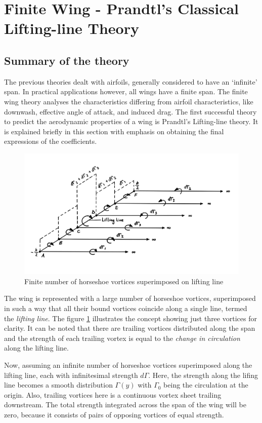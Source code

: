 \documentclass[letterpaper,12pt]{article}
\begin{document}
\section{Finite Wing - Prandtl's Classical Lifting-line Theory}
\subsection{Summary of the theory \cite{anderson}}
The previous theories dealt with airfoils, generally considered to have an `infinite' span. In practical applications however, all wings have a finite span. The finite wing theory analyses the characteristics differing from airfoil characteristics, like downwash, effective angle of attack, and induced drag.
The first successful theory to predict the aerodynamic properties of a wing is Prandtl's Lifting-line theory. It is explained briefly in this section with emphasis on obtaining the final expressions of the coefficients.

\begin{figure}[h]
\includegraphics[scale=0.4]{3.1_finite_vortices}
\centering
\caption{Finite number of horseshoe vortices superimposed on lifting line}
\label{3.1}
\end{figure}

The wing is represented with a large number of horseshoe vortices, superimposed in such a way that all their bound vortices coincide along a single line, termed the \textit{lifting line}. The figure \ref{3.1} illustrates the concept showing just three vortices for clarity. It can be noted that there are trailing vortices distributed along the span and the strength of each trailing vortex is equal to the \textit{change in circulation} along the lifting line.

Now, assuming an infinite number of horseshoe vortices superimposed along the lifting line, each with infinitesimal strength $d\Gamma$. Here, the strength along the lifing line becomes a smooth distribution $\Gamma(y)$ with $\Gamma_0$ being the circulation at the origin. Also, trailing vortices here is a continuous vortex sheet trailing downstream. The total strength integrated across the span of the wing will be zero, because it consists of pairs of opposing vortices of equal strength.
\end{document}
